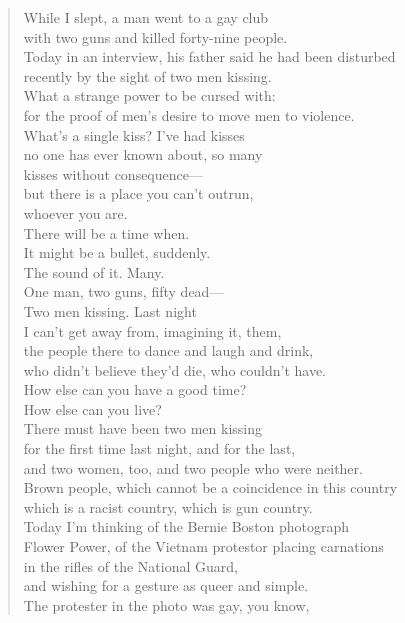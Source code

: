 \begin{verse}
	While I slept, a man went to a gay club\\
	with two guns and killed forty-nine people.\\
	Today in an interview, his father said he had been disturbed\\
	recently by the sight of two men kissing.\\
	What a strange power to be cursed with:\\
	for the proof of men's desire to move men to violence.\\
	What's a single kiss? I've had kisses\\
	no one has ever known about, so many\\
	kisses without consequence—\\
	but there is a place you can't outrun,\\
	whoever you are.\\
	There will be a time when.\\
	It might be a bullet, suddenly.\\
	The sound of it. Many.\\
	One man, two guns, fifty dead—\\
	Two men kissing. Last night\\
	I can't get away from, imagining it, them,\\
	the people there to dance and laugh and drink,\\
	who didn't believe they'd die, who couldn't have.\\
	How else can you have a good time?\\
	How else can you live?\\
	There must have been two men kissing\\
	for the first time last night, and for the last,\\
	and two women, too, and two people who were neither.\\
	Brown people, which cannot be a coincidence in this country\\
	which is a racist country, which is gun country.\\
	Today I'm thinking of the Bernie Boston photograph\\
	Flower Power, of the Vietnam protestor placing carnations\\
	in the rifles of the National Guard,\\
	and wishing for a gesture as queer and simple.\\
	The protester in the photo was gay, you know,\\

\end{verse}
